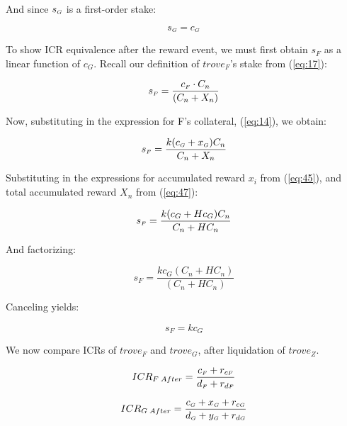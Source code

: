 \documentclass[reqno]{article}
\begin{document}
\bigskip
And since $s_\mathsmaller{G}$ is a first-order stake:

\begin{equation} \label{eq:21}
    s_\mathsmaller{G}=c_\mathsmaller{G}
\end{equation}

\bigskip
To show ICR equivalence after the reward event, we must first obtain $s_F$ as a linear function of $c_G$. Recall our definition of $trove_F$’s stake from (\ref{eq:17}):

\begin{equation} 
    s_\mathsmaller{F}=\frac{c_\mathsmaller{F} \cdot C_n}{(C_n+X_n)}
\end{equation}

\bigskip
Now, substituting in the expression for F’s collateral, (\ref{eq:14}), we obtain:

\begin{equation} 
    s_\mathsmaller{F}=\frac{k(c_\mathsmaller{G}+x_\mathsmaller{G})C_n}{C_n+X_n}
\end{equation}


\bigskip
Substituting in the expressions for accumulated reward $x_i$ from (\ref{eq:45}), and total accumulated reward $X_n$ from (\ref{eq:47}):

\begin{equation} 
    s_\mathsmaller{F}=\frac{k(c_G+Hc_G)C_n}{C_n+HC_n}
\end{equation}

\bigskip
And factorizing:

\begin{equation} 
    s_F=\frac{kc_G(C_n+HC_n)}{(C_n+HC_n)}
\end{equation}

\bigskip
Canceling yields:

\begin{equation} \label{eq:29}
    s_F=kc_G
\end{equation}

\bigskip
We now compare ICRs of $trove_F$ and $trove_G$, after liquidation of $trove_Z$.

\begin{equation} 
    ICR_{F \; After}=\frac{c_\mathsmaller{F}+r_{c\mathsmaller{F}}}{d_\mathsmaller{F}+r_{d\mathsmaller{F}}}
\end{equation}

\begin{equation} 
    ICR_{G \; After}=\frac{c_\mathsmaller{G}+x_\mathsmaller{G}+r_{c\mathsmaller{G}}}{d_\mathsmaller{G}+y_\mathsmaller{G}+r_{d\mathsmaller{G}}}
\end{equation}
\end{document}
